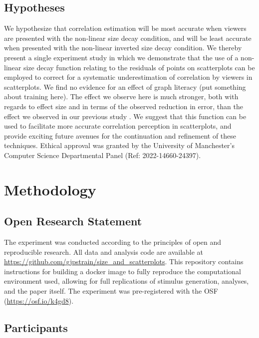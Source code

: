 \documentclass{vgtc}                          %
\begin{document}
\hypertarget{hypotheses}{%
\subsection{Hypotheses}\label{hypotheses}}

We hypothesize that correlation estimation will be most accurate when
viewers are presented with the non-linear size decay condition, and will be
least accurate when presented with the non-linear inverted size decay condition.
We thereby present a single experiment study in which we demonstrate that the use of
a non-linear size decay function relating to the residuals of points on scatterplots
can be employed to correct for a systematic underestimation of correlation by
viewers in scatterplots. We find no evidence for an effect of graph literacy (put
something about training here). The effect we observe here is much stronger, both
with regards to effect size and in terms of the observed reduction in error, than the
effect we observed in our previous study \cite{strain_2023}. We suggest that this
function can be used to facilitate more accurate correlation
perception in scatterplots, and provide exciting future avenues for the continuation
and refinement of these techniques. Ethical approval was granted by the University
of Manchester's Computer Science Departmental Panel (Ref: 2022-14660-24397).

\hypertarget{methodology}{%
\section{Methodology}\label{methodology}}

\hypertarget{open-research-statement}{%
\subsection{Open Research Statement}\label{open-research-statement}}

The experiment was conducted according to the principles of open and reproducible research.
All data and analysis code are available at \url{https://github.com/gjpstrain/size_and_scatterplots}.
This repository contains instructions for building a docker image to fully
reproduce the computational environment used, allowing for full replications
of stimulus generation, analyses, and the paper itself. The experiment was
pre-registered with the OSF (\url{https://osf.io/k4gd8}).

\hypertarget{participants}{%
\subsection{Participants}\label{participants}}
\end{document}
